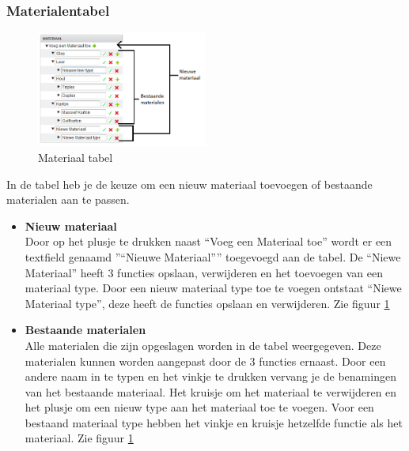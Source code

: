 \subsubsection{Materialentabel }
\begin{figure}[Hh]
	\centering
	\includegraphics[width=0.5\textwidth]{Images/materiaaltable2.png}
	\caption{Materiaal tabel }
	\label{fig:materialentabel}
\end{figure}

In de tabel heb je de keuze om een nieuw materiaal toevoegen of bestaande materialen aan te passen. 

\begin {itemize}
\item \textbf{Nieuw materiaal}\\
Door op het plusje te drukken naast ``Voeg een Materiaal toe'' wordt er een textfield genaamd ''“Nieuwe Materiaal”'' toegevoegd aan de tabel. De ``Niewe Materiaal'' heeft 3 functies opslaan, verwijderen en het toevoegen van een materiaal type. Door een nieuw materiaal type toe te voegen ontstaat ``Niewe Materiaal type'', deze heeft de functies opslaan en verwijderen. Zie figuur \ref{fig:materialentabel}

\item \textbf{Bestaande materialen}\\
Alle materialen die zijn opgeslagen worden in de tabel weergegeven. Deze materialen kunnen worden aangepast door de 3 functies ernaast. Door een andere naam in te typen en het vinkje te drukken vervang je de benamingen van het bestaande materiaal. Het kruisje om het materiaal te verwijderen en het plusje om een nieuw type aan het materiaal toe te voegen. Voor een bestaand materiaal type hebben het vinkje en kruisje hetzelfde functie als het materiaal. Zie figuur \ref{fig:materialentabel}
\end {itemize}

